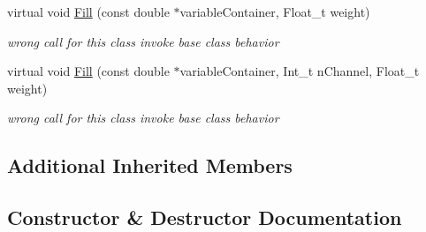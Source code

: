 \begin{DoxyCompactItemize}
\mbox{\label{classQn_1_1CorrectionProfile3DCorrelations_abd5a109f482219cb8f8a48ec3fbf4f6d}} 
virtual void \mbox{\hyperlink{classQn_1_1CorrectionProfile3DCorrelations_abd5a109f482219cb8f8a48ec3fbf4f6d}{Fill}} (const double $\ast$variable\+Container, Float\+\_\+t weight)
\begin{DoxyCompactList}\small\item\em wrong call for this class invoke base class behavior \end{DoxyCompactList}\item 
\mbox{\label{classQn_1_1CorrectionProfile3DCorrelations_a1fb7c64ce84f414394b66cb21b2775c0}} 
virtual void \mbox{\hyperlink{classQn_1_1CorrectionProfile3DCorrelations_a1fb7c64ce84f414394b66cb21b2775c0}{Fill}} (const double $\ast$variable\+Container, Int\+\_\+t n\+Channel, Float\+\_\+t weight)
\begin{DoxyCompactList}\small\item\em wrong call for this class invoke base class behavior \end{DoxyCompactList}\end{DoxyCompactItemize}
\subsection*{Additional Inherited Members}


\subsection{Constructor \& Destructor Documentation}
\mbox{\label{classQn_1_1CorrectionProfile3DCorrelations_a7894d83ced5e0e9d7d4022984483c7d2}} 

